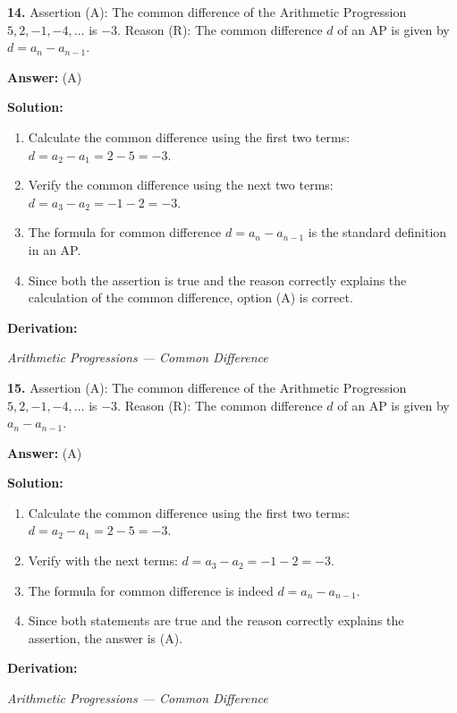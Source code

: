 \documentclass[12pt,a4paper]{exam}
\newcommand{\fitmath}[1]{%
  \sbox{\schmathbox}{$\displaystyle #1$}%
  \ifdim\wd\schmathbox>\linewidth
    \resizebox{\linewidth}{!}{\usebox{\schmathbox}}%
  \else
    \usebox{\schmathbox}%
  \fi}
\begin{document}
\begin{questions}
\question \textbf{14.} Assertion (A): The common difference of the Arithmetic Progression $5, 2, -1, -4, \dots$ is $-3$. Reason (R): The common difference $d$ of an AP is given by $d = a_{n} - a_{n-1}$.

\textbf{Answer:}
(A)

\textbf{Solution:}
\begin{enumerate}
  \item Calculate the common difference using the first two terms: $d = a_2 - a_1 = 2 - 5 = -3$.
  \item Verify the common difference using the next two terms: $d = a_3 - a_2 = -1 - 2 = -3$.
  \item The formula for common difference $d = a_n - a_{n-1}$ is the standard definition in an AP.
  \item Since both the assertion is true and the reason correctly explains the calculation of the common difference, option (A) is correct.
\end{enumerate}
\textbf{Derivation:}
\begin{center}
\fitmath{d = a_2 - a_1 = 2 - 5 = -3 \text{ and } d = a_3 - a_2 = -1 - 2 = -3}
\end{center}
\hfill \textit{Arithmetic Progressions — Common Difference}
\vspace{0.3cm}

\question \textbf{15.} Assertion (A): The common difference of the Arithmetic Progression $5, 2, -1, -4, \dots$ is $-3$. Reason (R): The common difference $d$ of an AP is given by $a_{n} - a_{n-1}$.

\textbf{Answer:}
(A)

\textbf{Solution:}
\begin{enumerate}
  \item Calculate the common difference using the first two terms: $d = a_2 - a_1 = 2 - 5 = -3$.
  \item Verify with the next terms: $d = a_3 - a_2 = -1 - 2 = -3$.
  \item The formula for common difference is indeed $d = a_n - a_{n-1}$.
  \item Since both statements are true and the reason correctly explains the assertion, the answer is (A).
\end{enumerate}
\textbf{Derivation:}
\begin{center}
\fitmath{d = a_2 - a_1 = 2 - 5 = -3}
\end{center}
\hfill \textit{Arithmetic Progressions — Common Difference}
\vspace{0.3cm}


\end{questions}
\end{document}
